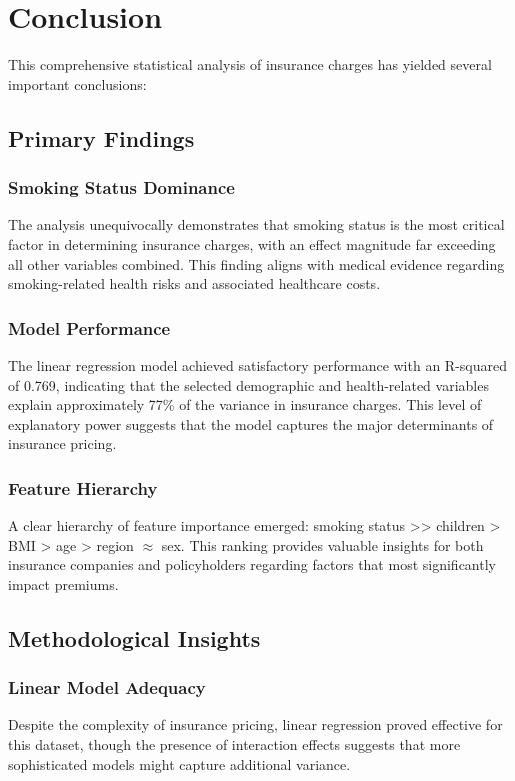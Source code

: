 \documentclass[12pt,a4paper]{article}
\begin{document}
\section{Conclusion}

This comprehensive statistical analysis of insurance charges has yielded several important conclusions:

\subsection{Primary Findings}

\subsubsection{Smoking Status Dominance}
The analysis unequivocally demonstrates that smoking status is the most critical factor in determining insurance charges, with an effect magnitude far exceeding all other variables combined. This finding aligns with medical evidence regarding smoking-related health risks and associated healthcare costs.

\subsubsection{Model Performance}
The linear regression model achieved satisfactory performance with an R-squared of 0.769, indicating that the selected demographic and health-related variables explain approximately 77\% of the variance in insurance charges. This level of explanatory power suggests that the model captures the major determinants of insurance pricing.

\subsubsection{Feature Hierarchy}
A clear hierarchy of feature importance emerged: smoking status >> children > BMI > age > region $\approx$ sex. This ranking provides valuable insights for both insurance companies and policyholders regarding factors that most significantly impact premiums.

\subsection{Methodological Insights}

\subsubsection{Linear Model Adequacy}
    Despite the complexity of insurance pricing, linear regression proved effective for this dataset, though the presence of interaction effects suggests that more sophisticated models might capture additional variance.
\end{document}
